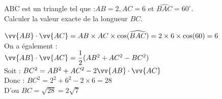 \documentclass[12pt,a4paper]{article}  %
\begin{document}
\graphicspath{{images/}}

\begin{center}

\end{center}





\exerciceDS{}
$\mathrm{ABC}$ est un triangle tel que :$A B=2, A C=6 \text { et } \widehat{B A C}=60^{\circ} .$\\
Calculer la valeur exacte de la longueur $B C$.

\begin{corrBox}
$\vv{AB}\cdot\vv{AC}=AB\times AC\times\cos(\widehat{BAC})=2\times6\times\cos(60)=6$\\
On a également :\\
$\vv{AB}\cdot\vv{AC}=\dfrac{1}{2}(AB^2+AC^2-BC^2)$\\
Soit : $BC^2=AB^2+AC^2-2\vv{AB}\cdot\vv{AC}$\\
Donc : $BC^2=2^2+6^2-2\times6=28$\\
D'ou $BC=\sqrt{28}=2\sqrt{7}$
\end{corrBox}
\end{document}
